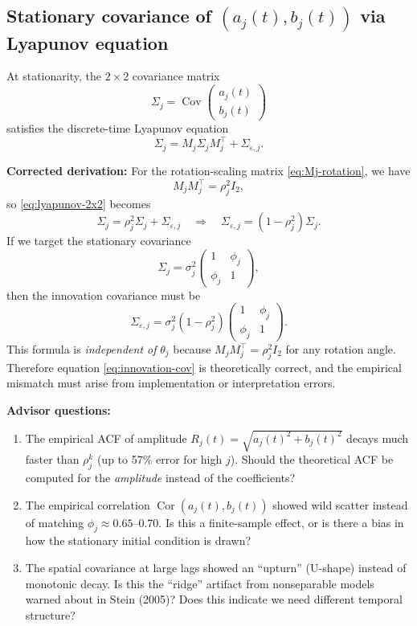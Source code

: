 \documentclass[answers,12pt,addpoints]{exam}
\begin{document}
\subsection{Stationary covariance of $(a_j(t), b_j(t))$ via Lyapunov equation}
\label{sec:lyapunov-fix}

At stationarity, the $2\times2$ covariance matrix
\[
  \Sigma_{j}
  =
  \operatorname{Cov}\begin{pmatrix}a_j(t)\\b_j(t)\end{pmatrix}
\]
satisfies the discrete-time Lyapunov equation
\begin{equation}
  \Sigma_j = M_j \Sigma_j M_j^\top + \Sigma_{\varepsilon,j}.
  \label{eq:lyapunov-2x2}
\end{equation}

{\color{blue}
\textbf{Corrected derivation:} For the rotation-scaling matrix \eqref{eq:Mj-rotation}, we have
\[
  M_j M_j^\top = \rho_j^2 I_2,
\]
so \eqref{eq:lyapunov-2x2} becomes
\[
  \Sigma_j = \rho_j^2 \Sigma_j + \Sigma_{\varepsilon,j}
  \quad \Longrightarrow \quad
  \Sigma_{\varepsilon,j} = (1 - \rho_j^2) \Sigma_j.
\]
If we target the stationary covariance
\[
  \Sigma_j = \sigma_j^2 \begin{pmatrix} 1 & \phi_j \\ \phi_j & 1 \end{pmatrix},
\]
then the innovation covariance must be
\[
  \Sigma_{\varepsilon,j} = \sigma_j^2(1 - \rho_j^2) \begin{pmatrix} 1 & \phi_j \\ \phi_j & 1 \end{pmatrix}.
\]
This formula is \emph{independent of} $\theta_j$ because $M_j M_j^\top = \rho_j^2 I_2$ for any rotation angle. Therefore equation \eqref{eq:innovation-cov} is theoretically correct, and the empirical mismatch must arise from implementation or interpretation errors.
}

{\color{blue}
\textbf{Advisor questions:}
\begin{enumerate}
  \item The empirical ACF of amplitude $R_j(t) = \sqrt{a_j(t)^2 + b_j(t)^2}$ decays much faster than $\rho_j^k$ (up to 57\% error for high $j$). Should the theoretical ACF be computed for the \emph{amplitude} instead of the coefficients?
  
  \item The empirical correlation $\operatorname{Cor}(a_j(t), b_j(t))$ showed wild scatter instead of matching $\phi_j \approx 0.65$--0.70. Is this a finite-sample effect, or is there a bias in how the stationary initial condition is drawn?
  
  \item The spatial covariance at large lags showed an ``upturn'' (U-shape) instead of monotonic decay. Is this the ``ridge'' artifact from nonseparable models warned about in Stein (2005)? Does this indicate we need different temporal structure?
\end{enumerate}
}
\end{document}

